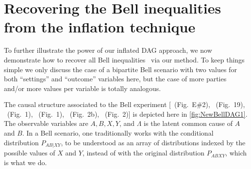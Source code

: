 {\section{Recovering the Bell inequalities from the inflation technique}
\label{sec:Bellscenarios}


To further illustrate the power of our inflated DAG approach, we now demonstrate how to recover all Bell inequalities~\cite{Brunner2013Bell,bell1966lhvm,CHSHOriginal} via our method. To keep things simple we only discuss the case of a bipartite Bell scenario with two values for both ``settings'' and ``outcome'' variables here, but the case of more parties and/or more values per variable is totally analogous.

The causal structure associated to the Bell \cite{bell1964einstein,Brunner2013Bell,bell1966lhvm,CHSHOriginal} experiment [\citealp{pusey2014gdag}~(Fig.~E\#2), \citealp{WoodSpekkens}~(Fig.~19), \citealp{chaves2014novel}~(Fig.~1), \citealp{BeyondBellII}~(Fig.~1), \citealp{wolfe2015nonconvexity}~(Fig.~2b), \citealp{steeg2011relaxation}~(Fig.~2)] is depicted here in \cref{fig:NewBellDAG1}. The observable variables are $A,B,X,Y$, and $\Lambda$ is the latent common cause of $A$ and $B$. In a Bell scenario, one traditionally works with the conditional distribution $P_{AB|XY}$, to be understood as an array of distributions indexed by the possible values of $X$ and $Y$, instead of with the original distribution $P_{ABXY}$, which is what we do.

}
